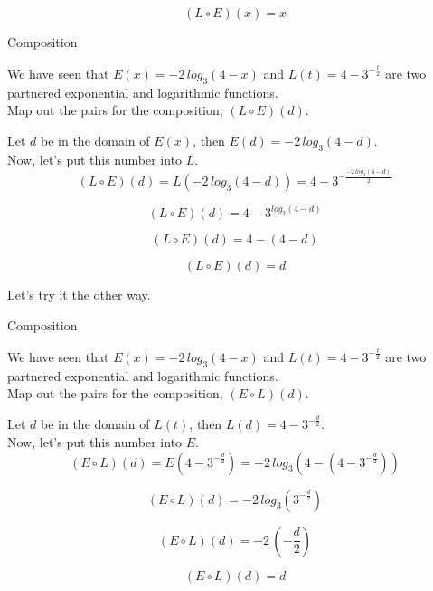 \documentclass{ximera}
\begin{document}
\[   (L \circ E)(x) = x        \]




\begin{example}  Composition

We have seen that $E(x) = -2 \,log_3(4-x)$ and $L(t) = 4 - 3^{-\frac{t}{2}}$ are two partnered exponential and logarithmic functions. \\


Map out the pairs for the composition, $(L \circ E)(d)$.

\begin{explanation}


Let $d$ be in the domain of $E(x)$, then $E(d) = -2 \,log_3(4-d)$. \\

Now, let's put this number into $L$. \\



\[    (L \circ E)(d)  =  L(-2 \,log_3(4-d)) = 4 - 3^{-\frac{-2 \,log_3(4-d)}{2}}              \]


\[    (L \circ E)(d)  =  4 - 3^{log_3(4-d)}              \]


\[    (L \circ E)(d)  =  4 - (4-d)             \]


\[    (L \circ E)(d)  = d             \]

\end{explanation}
\end{example}




Let's try it the other way.










\begin{example}  Composition

We have seen that $E(x) = -2 \,log_3(4-x)$ and $L(t) = 4 - 3^{-\frac{t}{2}}$ are two partnered exponential and logarithmic functions. \\



Map out the pairs for the composition, $(E \circ L)(d)$.

\begin{explanation}



Let $d$ be in the domain of $L(t)$, then $L(d) = 4 - 3^{-\frac{d}{2}}$. \\

Now, let's put this number into $E$. \\



\[    (E \circ L)(d)  =  E(4 - 3^{-\frac{d}{2}}) = -2 \,log_3(4 - (4 - 3^{-\frac{d}{2}}))            \]


\[    (E \circ L)(d)  =  -2 \,log_3( 3^{-\frac{d}{2}})              \]


\[    (E \circ L)(d)  = -2 \, \left(-\frac{d}{2}\right)              \]


\[    (E \circ L)(d)  = d            \]

\end{explanation}
\end{example}
\end{document}
